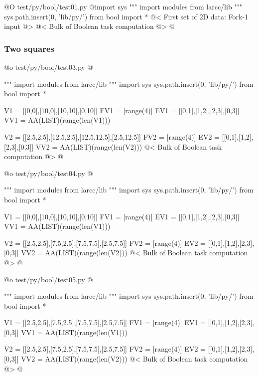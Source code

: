 \documentclass[11pt,oneside]{article}	%
\begin{document}
@O test/py/bool/test01.py
@{import sys
""" import modules from larcc/lib """
sys.path.insert(0, 'lib/py/')
from bool import *
@< First set of 2D data: Fork-1 input @>
@< Bulk of Boolean task computation @>
@}


\subsubsection{Two squares}




@o test/py/bool/test03.py
@{""" import modules from larcc/lib """
import sys
sys.path.insert(0, 'lib/py/')
from bool import *

V1 = [[0,0],[10,0],[10,10],[0,10]]
FV1 = [range(4)]
EV1 = [[0,1],[1,2],[2,3],[0,3]]
VV1 = AA(LIST)(range(len(V1)))

V2 = [[2.5,2.5],[12.5,2.5],[12.5,12.5],[2.5,12.5]]
FV2 = [range(4)]
EV2 = [[0,1],[1,2],[2,3],[0,3]]
VV2 = AA(LIST)(range(len(V2)))
@< Bulk of Boolean task computation @>
@}


@o test/py/bool/test04.py
@{""" import modules from larcc/lib """
import sys
sys.path.insert(0, 'lib/py/')
from bool import *

V1 = [[0,0],[10,0],[10,10],[0,10]]
FV1 = [range(4)]
EV1 = [[0,1],[1,2],[2,3],[0,3]]
VV1 = AA(LIST)(range(len(V1)))

V2 = [[2.5,2.5],[7.5,2.5],[7.5,7.5],[2.5,7.5]]
FV2 = [range(4)]
EV2 = [[0,1],[1,2],[2,3],[0,3]]
VV2 = AA(LIST)(range(len(V2)))
@< Bulk of Boolean task computation @>
@}

@o test/py/bool/test05.py
@{""" import modules from larcc/lib """
import sys
sys.path.insert(0, 'lib/py/')
from bool import *

V1 = [[2.5,2.5],[7.5,2.5],[7.5,7.5],[2.5,7.5]]
FV1 = [range(4)]
EV1 = [[0,1],[1,2],[2,3],[0,3]]
VV1 = AA(LIST)(range(len(V1)))

V2 = [[2.5,2.5],[7.5,2.5],[7.5,7.5],[2.5,7.5]]
FV2 = [range(4)]
EV2 = [[0,1],[1,2],[2,3],[0,3]]
VV2 = AA(LIST)(range(len(V2)))
@< Bulk of Boolean task computation @>
@}
\end{document}
